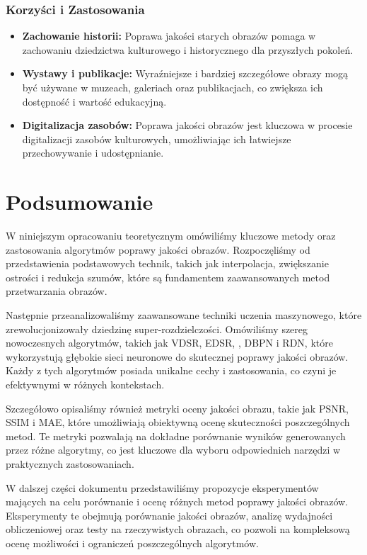 \documentclass[10pt]{article}
\begin{document}
\subsubsection*{Korzyści i Zastosowania}

\begin{itemize}
    \item \textbf{Zachowanie historii:} Poprawa jakości starych obrazów pomaga w zachowaniu dziedzictwa kulturowego i historycznego dla przyszłych pokoleń.
    \item \textbf{Wystawy i publikacje:} Wyraźniejsze i bardziej szczegółowe obrazy mogą być używane w muzeach, galeriach oraz publikacjach, co zwiększa ich dostępność i wartość edukacyjną.
    \item \textbf{Digitalizacja zasobów:} Poprawa jakości obrazów jest kluczowa w procesie digitalizacji zasobów kulturowych, umożliwiając ich łatwiejsze przechowywanie i udostępnianie.
\end{itemize}

\section*{Podsumowanie}

W niniejszym opracowaniu teoretycznym omówiliśmy kluczowe metody oraz zastosowania algorytmów poprawy jakości obrazów. Rozpoczęliśmy od przedstawienia podstawowych technik, takich jak interpolacja, zwiększanie ostrości i redukcja szumów, które są fundamentem zaawansowanych metod przetwarzania obrazów.

Następnie przeanalizowaliśmy zaawansowane techniki uczenia maszynowego, które zrewolucjonizowały dziedzinę super-rozdzielczości. Omówiliśmy szereg nowoczesnych algorytmów, takich jak VDSR, EDSR, , DBPN i RDN, które wykorzystują głębokie sieci neuronowe do skutecznej poprawy jakości obrazów. Każdy z tych algorytmów posiada unikalne cechy i zastosowania, co czyni je efektywnymi w różnych kontekstach.

Szczegółowo opisaliśmy również metryki oceny jakości obrazu, takie jak PSNR, SSIM i MAE, które umożliwiają obiektywną ocenę skuteczności poszczególnych metod. Te metryki pozwalają na dokładne porównanie wyników generowanych przez różne algorytmy, co jest kluczowe dla wyboru odpowiednich narzędzi w praktycznych zastosowaniach.

W dalszej części dokumentu przedstawiliśmy propozycje eksperymentów mających na celu porównanie i ocenę różnych metod poprawy jakości obrazów. Eksperymenty te obejmują porównanie jakości obrazów, analizę wydajności obliczeniowej oraz testy na rzeczywistych obrazach, co pozwoli na kompleksową ocenę możliwości i ograniczeń poszczególnych algorytmów.
\end{document}
